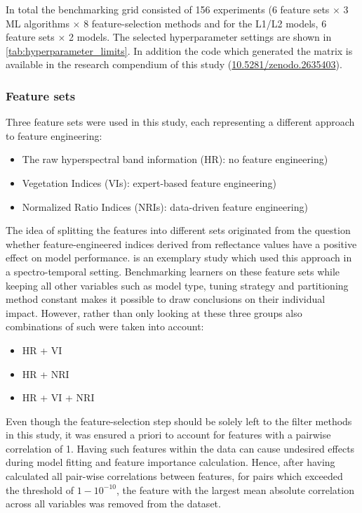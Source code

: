 \documentclass[peerreview]{IEEEtran}
\begin{document}
In total the benchmarking grid consisted of 156 experiments (6 feature sets $\times$ 3 ML algorithms $\times$ 8 feature-selection methods and for the L1/L2 models, 6 feature sets $\times$ 2 models.
The selected hyperparameter settings are shown in \autoref{tab:hyperparameter_limits}.
In addition the code which generated the matrix is available in the research compendium of this study (\url{10.5281/zenodo.2635403}).

\subsubsection{Feature sets}

Three feature sets were used in this study, each representing a different approach to feature engineering:

\begin{itemize}
	\item The raw hyperspectral band information (HR): no feature engineering) %
	\item Vegetation Indices (\ac{VI}s): expert-based feature engineering)
	\item Normalized Ratio Indices (\ac{NRI}s): data-driven feature engineering)
\end{itemize}

The idea of splitting the features into different sets originated from the question whether feature-engineered indices derived from reflectance values have a positive effect on model performance.
\cite{pena2017} is an exemplary study which used this approach in a spectro-temporal setting.
Benchmarking learners on these feature sets while keeping all other variables such as model type, tuning strategy and partitioning method constant makes it possible to draw conclusions on their individual impact.
However, rather than only looking at these three groups also combinations of such were taken into account:

\begin{itemize}
	\item HR + VI %
	\item HR + NRI
	\item HR + VI + NRI
\end{itemize}

Even though the feature-selection step should be solely left to the filter methods in this study, it was ensured a priori to account for features with a pairwise correlation of 1.
Having such features within the data can cause undesired effects during model fitting and feature importance calculation.
Hence, after having calculated all pair-wise correlations between features, for pairs which exceeded the threshold of $1 - 10^{-10}$, the feature with the largest mean absolute correlation across all variables was removed from the dataset.
\end{document}
